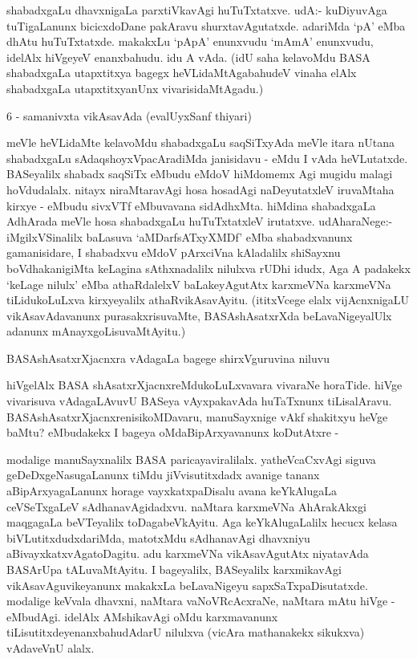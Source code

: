shabadxgaLu dhavxnigaLa parxtiVkavAgi huTuTxtatxve. udA:- kuDiyuvAga tuTigaLanunx bicicxdoDane pakAravu shurxtavAgutatxde. adariMda `pA' eMba dhAtu huTuTxtatxde. makakxLu `pApA' enunxvudu `mAmA' enunxvudu, idelAlx hiVgeyeV enanxbahudu. idu A vAda. (idU saha kelavoMdu BASA shabadxgaLa utapxtitxya bagegx heVLidaMtAgabahudeV vinaha elAlx shabadxgaLa utapxtitxyanUnx vivarisidaMtAgadu.)

6 - samanivxta vikAsavAda (evalUyxSanf thiyari)

meVle heVLidaMte kelavoMdu shabadxgaLu saqSiTxyAda meVle itara nUtana shabadxgaLu sAdaqshoyxVpacAradiMda janisidavu - eMdu I vAda heVLutatxde. BASeyalilx shabadx saqSiTx eMbudu eMdoV hiMdomemx Agi mugidu malagi hoVdudalalx. nitayx niraMtaravAgi hosa hosadAgi naDeyutatxleV iruvaMtaha kirxye - eMbudu sivxVTf eMbuvavana sidAdhxMta. hiMdina shabadxgaLa AdhArada meVle hosa shabadxgaLu huTuTxtatxleV irutatxve. udAharaNege:- iMgilxVSinalilx baLasuva `aMDarfsATxyXMDf' eMba shabadxvanunx gamanisidare, I shabadxvu eMdoV pArxciVna kAladalilx shiSayxnu boVdhakanigiMta keLagina sAthxnadalilx nilulxva rUDhi idudx, Aga A padakekx `keLage nilulx' eMba athaRdalelxV baLakeyAgutAtx karxmeVNa karxmeVNa tiLidukoLuLxva kirxyeyalilx athaRvikAsavAyitu. (ititxVcege elalx vijAcnxnigaLU vikAsavAdavanunx purasakxrisuvaMte, BASAshAsatxrXda beLavaNigeyalUlx adanunx mAnayxgoLisuvaMtAyitu.)

BASAshAsatxrXjacnxra vAdagaLa bagege shirxVguruvina niluvu

hiVgelAlx BASA shAsatxrXjacnxreMdukoLuLxvavara vivaraNe horaTide. hiVge vivarisuva vAdagaLAvuvU BASeya vAyxpakavAda huTaTxnunx tiLisalAravu. BASAshAsatxrXjacnxrenisikoMDavaru, manuSayxnige vAkf shakitxyu heVge baMtu? eMbudakekx I bageya oMdaBipArxyavanunx koDutAtxre - 

modalige manuSayxnalilx BASA paricayaviralilalx. yatheVcaCxvAgi siguva geDeDxgeNasugaLanunx tiMdu jiVvisutitxdadx avanige tananx aBipArxyagaLanunx horage vayxkatxpaDisalu avana keYkAlugaLa ceVSeTxgaLeV sAdhanavAgidadxvu. naMtara karxmeVNa AhArakAkxgi maqgagaLa beVTeyalilx toDagabeVkAyitu. Aga keYkAlugaLalilx hecucx kelasa biVLutitxdudxdariMda, matotxMdu sAdhanavAgi dhavxniyu aBivayxkatxvAgatoDagitu. adu karxmeVNa vikAsavAgutAtx niyatavAda BASArUpa tALuvaMtAyitu. I bageyalilx, BASeyalilx karxmikavAgi vikAsavAguvikeyanunx makakxLa beLavaNigeyu sapxSaTxpaDisutatxde. modalige keVvala dhavxni, naMtara vaNoVRcAcxraNe, naMtara mAtu hiVge - eMbudAgi. idelAlx AMshikavAgi oMdu karxmavanunx tiLisutitxdeyenanxbahudAdarU nilulxva (vicAra mathanakekx sikukxva) vAdaveVnU alalx.

